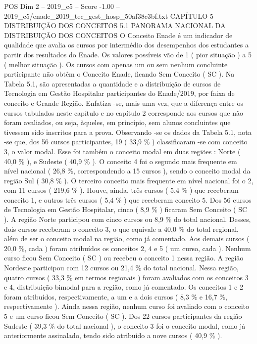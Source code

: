 \begin{textsample}{POS Dim 2 – 2019\_c5 – Score -1.00 – 2019\_c5/enade\_2019\_tec\_gest\_hosp\_50af38c3bf.txt}  \label{ex:f2_pos_341}
CAPÍTULO 5 DISTRIBUIÇÃO DOS CONCEITOS 5.1 PANORAMA NACIONAL DA DISTRIBUIÇÃO DOS CONCEITOS O Conceito Enade é um indicador de qualidade que avalia os cursos por intermédio dos desempenhos dos estudantes a partir dos resultados do Enade.
Os valores possíveis vão de 1 ( pior situação ) a 5 ( melhor situação ).
Os cursos com apenas um ou sem nenhum concluinte participante não obtêm o Conceito Enade, ficando Sem Conceito ( SC ).
Na Tabela 5.1, são apresentadas a quantidade e a distribuição de cursos de Tecnologia em Gestão Hospitalar participantes do Enade/2019, por faixa de conceito e Grande Região.
Enfatiza -se, mais uma vez, que a diferença entre os cursos tabulados neste capítulo e no capítulo 2 corresponde aos cursos que não foram avaliados, ou seja, àqueles, em princípio, sem alunos concluintes que tivessem sido inscritos para a prova.
Observando -se os dados da Tabela 5.1, nota -se que, dos 56 cursos participantes, 19 ( 33,9 \% ) classificaram -se com conceito 3, o valor modal.
Esse foi também o conceito modal em duas regiões : Norte ( 40,0 \% ), e Sudeste ( 40,9 \% ).
O conceito 4 foi o segundo mais frequente em nível nacional ( 26,8 \%, correspondendo a 15 cursos ), sendo o conceito modal da região Sul ( 30,8 \% ).
O terceiro conceito mais frequente em nível nacional foi o 2, com 11 cursos ( 219,6 \% ).
Houve, ainda, três cursos ( 5,4 \% ) que receberam conceito 1, e outros três cursos ( 5,4 \% ) que receberam conceito 5.
Dos 56 cursos de Tecnologia em Gestão Hospitalar, cinco ( 8,9 \% ) ficaram Sem Conceito ( SC ).
A região Norte participou com cinco cursos ou 8,9 \% do total nacional.
Desses, dois cursos receberam o conceito 3, o que equivale a 40,0 \% do total regional, além de ser o conceito modal na região, como já comentado.
Aos demais cursos ( 20,0 \%, cada ) foram atribuídos os conceitos 2, 4 e 5 ( um curso, cada ).
Nenhum curso ficou Sem Conceito ( SC ) ou recebeu o conceito 1 nessa região.
A região Nordeste participou com 12 cursos ou 21,4 \% do total nacional.
Nessa região, quatro cursos ( 33,3 \% em termos regionais ) foram avaliados com os conceitos 3 e 4, distribuição bimodal para a região, como já comentado.
Os conceitos 1 e 2 foram atribuídos, respectivamente, a um e a dois cursos ( 8,3 \% e 16,7 \%, respectivamente ).
Ainda nessa região, nenhum curso foi avaliado com o conceito 5 e um curso ficou Sem Conceito ( SC ).
Dos 22 cursos participantes da região Sudeste ( 39,3 \% do total nacional ), o conceito 3 foi o conceito modal, como já anteriormente assinalado, tendo sido atribuído a nove cursos ( 40,9 \% ).

\end{textsample}
